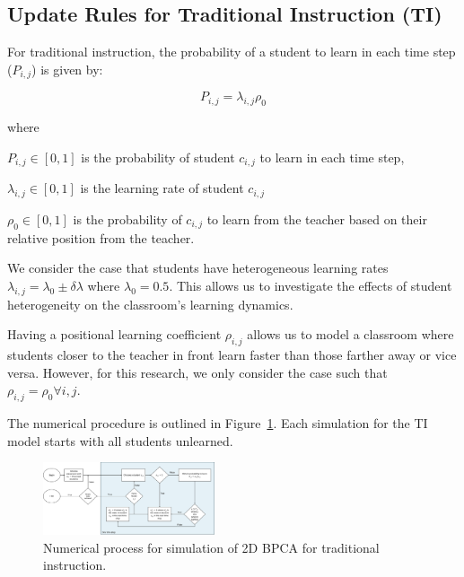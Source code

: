 \documentclass[twocolumn,secnumarabic,amssymb, nobibnotes, aps, prd]{revtex4-2}
\begin{document}
    \subsection{Update Rules for Traditional Instruction (TI)}

        For traditional instruction, the probability of a student to learn in each time step ($P_{i,j}$) is given by:

        \begin{equation}
            P_{i,j} = \lambda_{i,j}\rho_0
        \end{equation}

        where

        $P_{i,j} \in [0,1]$ is the probability of student $c_{i,j}$ to learn in each time step, 

        $\lambda_{i,j} \in [0,1]$ is the learning rate of student $c_{i,j}$

        $\rho_{0} \in [0,1]$ is the probability of $c_{i,j}$ to learn from the teacher based on their relative position from the teacher.

        We consider the case that students have heterogeneous learning rates $\lambda_{i,j}=\lambda_0 \pm \delta\lambda$ where $\lambda_0=0.5$.
        This allows us to investigate the effects of student heterogeneity on the classroom's learning dynamics.

        Having a positional learning coefficient $\rho_{i,j}$ allows us to model a classroom where students closer to the teacher in front learn faster than those farther away or vice versa.
        However, for this research, we only consider the case such that $\rho_{i,j} = \rho_0 \forall i,j$.

        The numerical procedure is outlined in Figure~\ref{fig:TI flowchart}.
        Each simulation for the TI model starts with all students unlearned.

        \begin{figure}[htbp!]
            \centering
            \includegraphics[width=0.45\textwidth]{figures/2DBPCA TI Flowchart.png}
            \caption[Traditional instruction simulation flowchart]{Numerical process for simulation of 2D BPCA for traditional instruction.}
            \label{fig:TI flowchart}
        \end{figure}
\end{document}
